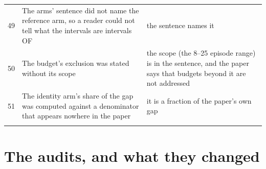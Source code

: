 \documentclass[11pt,a4paper]{article}
\begin{document}
\begin{longtable}{@{}>{\raggedleft\arraybackslash}p{0.7cm}>{\raggedright\arraybackslash}p{6.1cm}>{\raggedright\arraybackslash}p{8.55cm}@{}}
\rowcolor{uavzebra}
\textcolor{uavmuted}{49} & The arms' sentence did not name the reference arm, so a reader could not tell what the intervals are intervals OF & the sentence names it \\
\textcolor{uavmuted}{50} & The budget's exclusion was stated without its scope & the scope (the 8--25 episode range) is in the sentence, and the paper says that budgets beyond it are not addressed \\
\rowcolor{uavzebra}
\textcolor{uavmuted}{51} & The identity arm's share of the gap was computed against a denominator that appears nowhere in the paper & it is a fraction of the paper's own gap \\
\uavbottomrule
\end{longtable}
\endgroup

\section{The audits, and what they changed}
\end{document}
